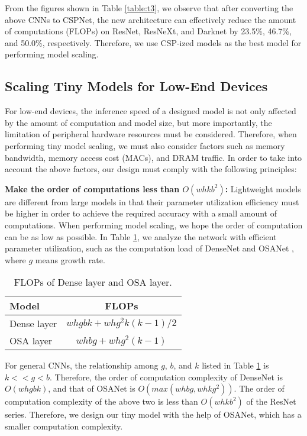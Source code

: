 \documentclass[10pt,twocolumn,letterpaper]{article}
\begin{document}
From the figures shown in Table \ref{table:t3}, we observe that after converting the above CNNs to CSPNet, the new architecture can effectively reduce the amount of computations (FLOPs) on ResNet, ResNeXt, and Darknet by 23.5\%, 46.7\%, and 50.0\%, respectively.  Therefore, we use CSP-ized models as the best model for performing model scaling.

\subsection{Scaling Tiny Models for Low-End Devices}
\label{ss:tp}

For low-end devices, the inference speed of a designed model is not only affected by the amount of computation and model size, but more importantly, the limitation of peripheral hardware resources must be considered.  Therefore, when performing tiny model scaling, we must also consider factors such as memory bandwidth, memory access cost (MACs), and DRAM traffic.  In order to take into account the above factors, our design must comply with the following principles:

\noindent
\textbf{Make the order of computations less than $O(whk{b}^{2})$:} Lightweight models are different from large models in that their parameter utilization efficiency must be higher in order to achieve the required accuracy with a small amount of computations.  When performing model scaling, we hope the order of computation can be as low as possible.  In Table \ref{table:t4}, we analyze the network with efficient parameter utilization, such as the computation load of DenseNet and OSANet \cite{lee2019energy}, where $g$ means growth rate.

\begin{table}[h]
	\centering
	\begin{threeparttable}[h]
		\footnotesize
		\caption{FLOPs of Dense layer and OSA layer.}
		\label{table:t4}
		\setlength\tabcolsep{3.5pt}
		\begin{tabular}{lc}
			\toprule
			\textbf{Model} & \textbf{FLOPs} \\				
			\midrule
			Dense layer & $whgbk + wh{g}^{2}k(k-1)/2$ \\
			OSA layer & $whbg + wh{g}^{2}(k-1)$ \\
			\bottomrule
		\end{tabular}
	\end{threeparttable}
\end{table}

For general CNNs, the relationship among $g$, $b$, and $k$ listed in Table \ref{table:t4} is $k << g < b$.  Therefore, the order of computation complexity of DenseNet is $O(whgbk)$, and that of OSANet is $O(max(whbg,whk{g}^{2}))$.  The order of computation complexity of the above two is less than $O(whk{b}^{2})$ of the ResNet series.  Therefore, we design our tiny model with the help of OSANet, which has a smaller computation complexity.
\end{document}
